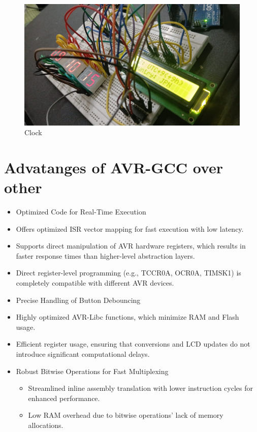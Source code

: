 \documentclass[journal]{IEEEtran}
\numberwithin{equation}{enumi}
\numberwithin{figure}{enumi}
\begin{document}
\begin{figure}[H]
    \centering
    \includegraphics[width=0.8\linewidth]{figs/Clock2.jpeg}
    \caption{Clock}
    \label{fig:enter-label}
\end{figure}

\section{Advatanges of AVR-GCC over other}
\begin{itemize}
    \item Optimized Code for Real-Time Execution
    \item Offers optimized ISR vector mapping for fast execution with low latency.
    \item Supports direct manipulation of AVR hardware registers, which results in faster response times than higher-level abstraction layers.
    \item Direct register-level programming (e.g., TCCR0A, OCR0A, TIMSK1) is completely compatible with different AVR devices.
\item Precise Handling of Button Debouncing
    \item Highly optimized AVR-Libc functions, which minimize RAM and Flash usage.
    \item Efficient register usage, ensuring that conversions and LCD updates do not introduce significant computational delays.
    \item Robust Bitwise Operations for Fast Multiplexing
    \begin{itemize}
    \item Streamlined inline assembly translation with lower instruction cycles for enhanced performance.
    \item Low RAM overhead due to bitwise operations' lack of memory allocations.
    \end{itemize}
\end{itemize}
\end{document}

